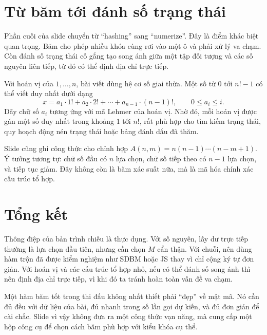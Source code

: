 \documentclass[11pt]{article}
\begin{document}
\section{Từ băm tới đánh số trạng thái}

Phần cuối của slide chuyển từ ``hashing'' sang ``numerize''. Đây là điểm khác
biệt quan trọng. Băm cho phép nhiều khóa cùng rơi vào một ô và phải xử lý va
chạm. Còn đánh số trạng thái cố gắng tạo song ánh giữa một tập đối tượng và
các số nguyên liên tiếp, từ đó có thể định địa chỉ trực tiếp.

Với hoán vị của \(1,\ldots,n\), bài viết dùng hệ cơ số giai thừa. Một số từ
\(0\) tới \(n!-1\) có thể viết duy nhất dưới dạng
\[
  x=a_1\cdot 1!+a_2\cdot 2!+\cdots+a_{n-1}\cdot (n-1)!,
  \qquad 0\le a_i\le i.
\]
Dãy chữ số \(a_i\) tương ứng với mã Lehmer của hoán vị. Nhờ đó, mỗi hoán vị
được gán một số duy nhất trong khoảng \(1\) tới \(n!\), rất phù hợp cho tìm
kiếm trạng thái, quy hoạch động nén trạng thái hoặc bảng đánh dấu đã thăm.

Slide cũng ghi công thức cho chỉnh hợp \(A(n,m)=n(n-1)\cdots(n-m+1)\). Ý
tưởng tương tự: chữ số đầu có \(n\) lựa chọn, chữ số tiếp theo có \(n-1\) lựa
chọn, và tiếp tục giảm. Đây không còn là băm xác suất nữa, mà là mã hóa chính
xác cấu trúc tổ hợp.

\section{Tổng kết}

Thông điệp của bản trình chiếu là thực dụng. Với số nguyên, lấy dư trực tiếp
thường là lựa chọn đầu tiên, nhưng cần chọn \(M\) cẩn thận. Với chuỗi, nên dùng
hàm trộn đã được kiểm nghiệm như SDBM hoặc JS thay vì chỉ cộng ký tự đơn giản.
Với hoán vị và các cấu trúc tổ hợp nhỏ, nếu có thể đánh số song ánh thì nên
định địa chỉ trực tiếp, vì khi đó ta tránh hoàn toàn vấn đề va chạm.

Một hàm băm tốt trong thi đấu không nhất thiết phải ``đẹp'' về mật mã. Nó cần
đủ đều với dữ liệu của bài, đủ nhanh trong số lần gọi dự kiến, và đủ đơn giản
để cài chắc. Slide vì vậy không đưa ra một công thức vạn năng, mà cung cấp
một hộp công cụ để chọn cách băm phù hợp với kiểu khóa cụ thể.
\end{document}
